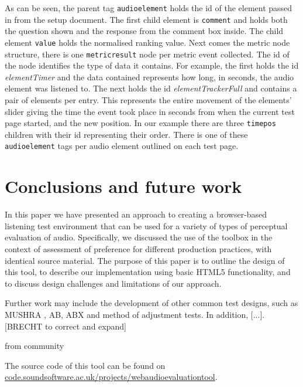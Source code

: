 \documentclass{article}
\begin{document}
As can be seen, the parent tag \texttt{audioelement} holds the id of the element passed in from the setup document. The first child element is \texttt{comment} and holds both the question shown and the response from the comment box inside.
The child element \texttt{value} holds the normalised ranking value. Next comes the metric node structure, there is one \texttt{metricresult} node per metric event collected. The id of the node identifies the type of data it contains. For example, the first holds the id \textit{elementTimer} and the data contained represents how long, in seconds, the audio element was listened to. The next holds the id \textit{elementTrackerFull} and contains a pair of elements per entry. This represents the entire movement of the elements' slider giving the time the event took place in seconds from when the current test page started, and the new position. In our example there are three \texttt{timepos} children with their id representing their order. There is one of these \texttt{audioelement} tags per audio element outlined on each test page. 

\section{Conclusions and future work}\label{sec:conclusions}

In this paper we have presented an approach to creating a browser-based listening test environment that can be used for a variety of types of perceptual evaluation of audio. 
Specifically, we discussed the use of the toolbox in the context of assessment of preference for different production practices, with identical source material. 
The purpose of this paper is to outline the design of this tool, to describe our implementation using basic HTML5 functionality, and to discuss design challenges and limitations of our approach. %

Further work may include the development of other common test designs, such as MUSHRA \cite{mushra}, AB, ABX and method of adjustment tests. 
In addition, [...]. 
[BRECHT to correct and expand]

from community



The source code of this tool can be found on \url{code.soundsoftware.ac.uk/projects/webaudioevaluationtool}. 



\end{document}
